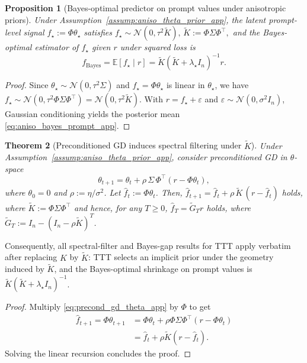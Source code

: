 \documentclass{article}
\theoremstyle{plain}
\newtheorem{theorem}{Theorem}[section]
\newtheorem{proposition}[theorem]{Proposition}
\theoremstyle{definition}
\theoremstyle{remark}
\begin{document}
\begin{proposition}[Bayes-optimal predictor on prompt values under anisotropic priors]\label{prop:aniso_bayes_prompt_app}
Under Assumption~\ref{assump:aniso_theta_prior_app}, the latent prompt-level signal $f_\star:=\Phi\theta_\star$ satisfies $f_\star \sim \mathcal{N}(0,\tau^2\widetilde K),\, \widetilde K:=\Phi\Sigma\Phi^\top,$ and the Bayes-optimal estimator of $f_\star$ given $r$ under squared loss is
\begin{equation}
    f_{\mathrm{Bayes}}
    = \mathbb{E}[f_\star\mid r]
    = \widetilde K(\widetilde K+\lambda_\star I_n)^{-1}r.
\label{eq:aniso_bayes_prompt_app}
\end{equation}
\end{proposition}

\begin{proof}
Since $\theta_\star\sim\mathcal{N}(0,\tau^2\Sigma)$ and $f_\star=\Phi\theta_\star$ is linear in $\theta_\star$,
we have $f_\star\sim\mathcal{N}(0,\tau^2\Phi\Sigma\Phi^\top)=\mathcal{N}(0,\tau^2\widetilde K)$.
With $r=f_\star+\varepsilon$ and $\varepsilon\sim\mathcal{N}(0,\sigma^2 I_n)$, Gaussian conditioning yields the
posterior mean \eqref{eq:aniso_bayes_prompt_app}.
\end{proof}

\begin{theorem}[Preconditioned GD induces spectral filtering under $\widetilde K$]
\label{thm:precond_gd_filter_app}
Under Assumption~\ref{assump:aniso_theta_prior_app}, consider preconditioned GD in $\theta$-space
\begin{equation}
    \theta_{t+1}=\theta_t+\rho\,\Sigma\,\Phi^\top(r-\Phi\theta_t),
\label{eq:precond_gd_theta_app}
\end{equation}
where $\theta_0=0$ and $\rho:=\eta/\sigma^2$. Let $\hat f_t:=\Phi\theta_t$. Then, $\hat f_{t+1}=\hat f_t+\rho\,\widetilde K\,(r-\hat f_t)$ holds, where $\widetilde K:=\Phi\Sigma\Phi^\top$ and hence, for any $T\ge 0$, $\hat f_T = \widetilde G_T r$ holds, where $\widetilde G_T := I_n-(I_n-\rho \widetilde K)^T$.
\end{theorem}

Consequently, all spectral-filter and Bayes-gap results for TTT apply verbatim after replacing $K$ by $\widetilde K$: TTT selects an implicit prior under the geometry induced by $\widetilde K$, and the Bayes-optimal shrinkage on prompt values is $\widetilde K(\widetilde K+\lambda_\star I_n)^{-1}$.

\begin{proof}
Multiply \eqref{eq:precond_gd_theta_app} by $\Phi$ to get
\begin{align*}
    \hat f_{t+1}=\Phi\theta_{t+1}
    &=\Phi\theta_t+\rho\Phi\Sigma\Phi^\top(r-\Phi\theta_t) \\
    &=\hat f_t+\rho\widetilde K(r-\hat f_t).
\end{align*}
Solving the linear recursion concludes the proof.
\end{proof}
\end{document}
